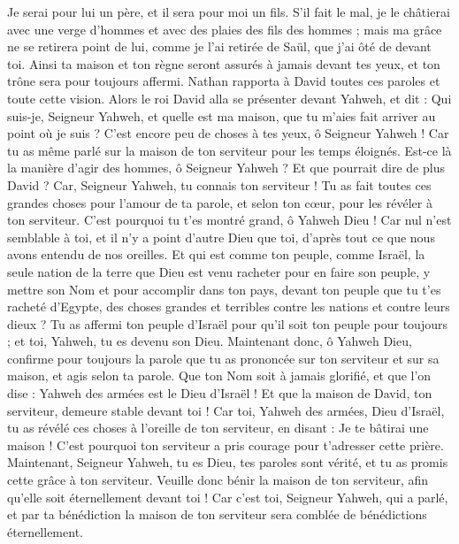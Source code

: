 \begin{multicols}{2}
Je serai pour lui un père, et il sera pour moi un fils. S’il fait le mal, je le châtierai avec une verge d’hommes et avec des plaies des fils des hommes ;
mais ma grâce ne se retirera point de lui, comme je l'ai retirée de Saül, que j'ai ôté de devant toi.
Ainsi ta maison et ton règne seront assurés à jamais devant tes yeux, et ton trône sera pour toujours affermi.
Nathan rapporta à David toutes ces paroles et toute cette vision.
Alors le roi David alla se présenter devant Yahweh, et dit : Qui suis-je, Seigneur Yahweh, et quelle est ma maison, que tu m'aies fait arriver au point où je suis ?
C’est encore peu de choses à tes yeux, ô Seigneur Yahweh ! Car tu as même parlé sur la maison de ton serviteur pour les temps éloignés. Est-ce là la manière d'agir des hommes, ô Seigneur Yahweh ?
Et que pourrait dire de plus David ? Car, Seigneur Yahweh, tu connais ton serviteur !
Tu as fait toutes ces grandes choses pour l’amour de ta parole, et selon ton cœur, pour les révéler à ton serviteur.
C’est pourquoi tu t’es montré grand, ô Yahweh Dieu ! Car nul n'est semblable à toi, et il n'y a point d'autre Dieu que toi, d’après tout ce que nous avons entendu de nos oreilles.
Et qui est comme ton peuple, comme Israël, la seule nation de la terre que Dieu est venu racheter pour en faire son peuple, y mettre son Nom et pour accomplir dans ton pays, devant ton peuple que tu t'es racheté d'Egypte, des choses grandes et terribles contre les nations et contre leurs dieux ?
Tu as affermi ton peuple d'Israël pour qu’il soit ton peuple pour toujours ; et toi, Yahweh, tu es devenu son Dieu.
Maintenant donc, ô Yahweh Dieu, confirme pour toujours la parole que tu as prononcée sur ton serviteur et sur sa maison, et agis selon ta parole.
Que ton Nom soit à jamais glorifié, et que l'on dise : Yahweh des armées est le Dieu d'Israël ! Et que la maison de David, ton serviteur, demeure stable devant toi !
Car toi, Yahweh des armées, Dieu d'Israël, tu as révélé ces choses à l’oreille de ton serviteur, en disant : Je te bâtirai une maison ! C'est pourquoi ton serviteur a pris courage pour t'adresser cette prière.
Maintenant, Seigneur Yahweh, tu es Dieu, tes paroles sont vérité, et tu as promis cette grâce à ton serviteur.
Veuille donc bénir la maison de ton serviteur, afin qu'elle soit éternellement devant toi ! Car c'est toi, Seigneur Yahweh, qui a parlé, et par ta bénédiction la maison de ton serviteur sera comblée de bénédictions éternellement.

\end{multicols}
